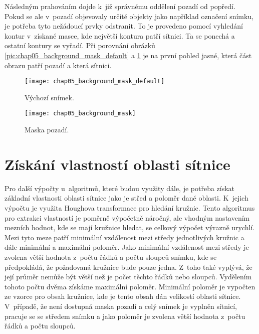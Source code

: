 Následným prahováním dojde k~již správnému oddělení pozadí od popředí. Pokud se ale v~pozadí objevovaly určité objekty jako například označení snímku, je potřeba tyto nežádoucí prvky odstranit. To je provedeno pomocí vyhledání kontur v~získané masce, kde největší kontura patří sítnici. Ta se ponechá a ostatní kontury se vyřadí. Při porovnání obrázků \ref{pic:chap05_background_mask_default} a \ref{pic:chap05_background_mask} je na první pohled jasné, která část obrazu patří pozadí a která sítnici.

\begin{figure}[h]
  \begin{minipage}[c]{0.47\textwidth}
    \texttt{[image: chap05\_background\_mask\_default]}
    \caption{Výchozí snímek.}
    \label{pic:chap05_background_mask_default}
  \end{minipage}
  \hfill
  \begin{minipage}[c]{0.47\textwidth}
    \texttt{[image: chap05\_background\_mask]}
    \caption{Maska pozadí.}
    \label{pic:chap05_background_mask}
  \end{minipage}
\end{figure}


\section{Získání vlastností oblasti sítnice}
Pro další výpočty u~algoritmů, které budou využity dále, je potřeba získat základní vlastnosti oblasti sítnice jako je střed a poloměr dané oblasti. K~jejich výpočtu je využita Houghova transformace pro hledání kružnic. Tento algoritmus pro extrakci vlastností je poměrně výpočetně náročný, ale vhodným nastavením mezních hodnot, kde se mají kružnice hledat, se celkový výpočet výrazně urychlí. Mezi tyto meze patří minimální vzdálenost mezi středy jednotlivých kružnic a dále minimální a maximální poloměr. Jako minimální vzdálenost mezi středy je zvolena větší hodnota z~počtu řádků a počtu sloupců snímku, kde se předpokládá, že požadovaná kružnice bude pouze jedna. Z~toho také vyplývá, že její průměr nemůže být větší než je počet těchto řádků nebo sloupců. Vydělením tohoto počtu dvěma získáme maximální poloměr. Minimální poloměr je vypočten ze vzorce pro obsah kružnice, kde je tento obsah dán velikostí oblasti sítnice. V~případě, že není dostupná maska pozadí a celý snímek je vyplněn sítnicí, pracuje se se středem snímku a jako poloměr je zvolena větší hodnota z~počtu řádků a počtu sloupců.


